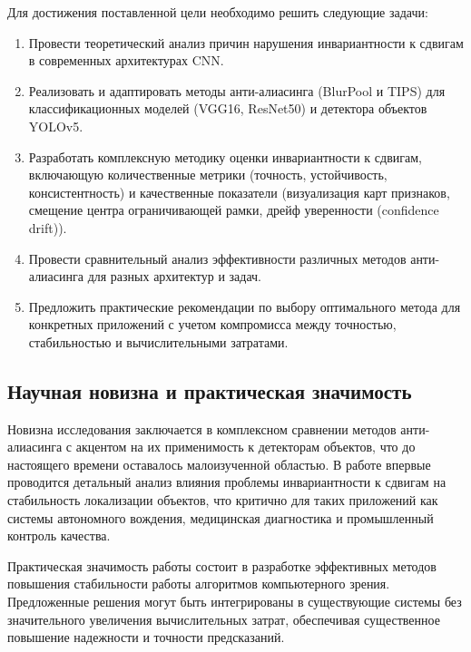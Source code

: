 Для достижения поставленной цели необходимо решить следующие задачи:

\begin{enumerate}
    \item Провести теоретический анализ причин нарушения инвариантности к сдвигам в современных архитектурах CNN.
    \item Реализовать и адаптировать методы анти-алиасинга (BlurPool и TIPS) для классификационных моделей (VGG16, ResNet50) и детектора объектов YOLOv5.
    \item Разработать комплексную методику оценки инвариантности к сдвигам, включающую количественные метрики (точность, устойчивость, консистентность) и качественные показатели (визуализация карт признаков, смещение центра ограничивающей рамки, дрейф уверенности (confidence drift)).
    \item Провести сравнительный анализ эффективности различных методов анти-алиасинга для разных архитектур и задач.
    \item Предложить практические рекомендации по выбору оптимального метода для конкретных приложений с учетом компромисса между точностью, стабильностью и вычислительными затратами.
\end{enumerate}

\subsection{Научная новизна и практическая значимость}

Новизна исследования заключается в комплексном сравнении методов анти-алиасинга с акцентом на их применимость к детекторам объектов, что до настоящего времени оставалось малоизученной областью. В работе впервые проводится детальный анализ влияния проблемы инвариантности к сдвигам на стабильность локализации объектов, что критично для таких приложений как системы автономного вождения, медицинская диагностика и промышленный контроль качества.

Практическая значимость работы состоит в разработке эффективных методов повышения стабильности работы алгоритмов компьютерного зрения. Предложенные решения могут быть интегрированы в существующие системы без значительного увеличения вычислительных затрат, обеспечивая существенное повышение надежности и точности предсказаний.

\newpage
